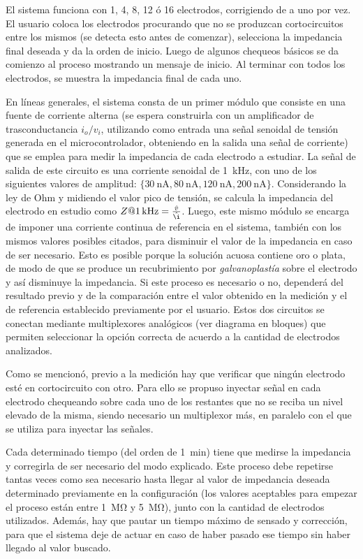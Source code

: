 El sistema funciona con 1, 4, 8, 12 ó 16 electrodos, corrigiendo de a uno por vez. El usuario coloca los electrodos procurando que no se produzcan cortocircuitos entre los mismos (se detecta esto antes de comenzar), selecciona la impedancia final deseada y da la orden de inicio. Luego de algunos chequeos básicos se da comienzo al proceso mostrando un mensaje de inicio. Al terminar con todos los electrodos, se muestra la impedancia final de cada uno. 

En líneas generales, el sistema consta de un primer módulo que consiste en una fuente de corriente alterna (se espera construirla con un amplificador de trasconductancia $i_o/v_i$, utilizando como entrada una señal senoidal de tensión generada en el microcontrolador, obteniendo en la salida una señal de corriente) que se emplea para medir la impedancia de cada electrodo a estudiar. La señal de salida de este circuito es una corriente senoidal de \SI{1}{\kilo\hertz}, con uno de los siguientes valores de amplitud: $\{\SI{30}{\nano\ampere}, \SI{80}{\nano\ampere}, \SI{120}{\nano\ampere}, \SI{200}{\nano\ampere}\}$. Considerando la ley de Ohm y midiendo el valor pico de tensión, se calcula la impedancia del electrodo en estudio como $Z@\SI{1}{\kilo\hertz} = \frac{\hat{v}}{\hat{\i}}$. Luego, este mismo módulo se encarga de imponer una corriente continua de referencia en el sistema, también con los mismos valores posibles citados, para disminuir el valor de la impedancia en caso de ser necesario. Esto es posible porque la solución acuosa contiene oro o plata, de modo de que se produce un recubrimiento por \emph{galvanoplastía} sobre el electrodo y así disminuye la impedancia. Si este proceso es necesario o no, dependerá del resultado previo y de la comparación entre el valor obtenido en la medición y el de referencia establecido previamente por el usuario. Estos dos circuitos se conectan mediante multiplexores analógicos (ver diagrama en bloques) que permiten seleccionar la opción correcta de acuerdo a la cantidad de electrodos analizados. 

Como se mencionó, previo a la medición hay que verificar que ningún electrodo esté en cortocircuito con otro. Para ello se propuso inyectar señal en cada electrodo chequeando sobre cada uno de los restantes que no se reciba un nivel elevado de la misma, siendo necesario un multiplexor más, en paralelo con el que se utiliza para inyectar las señales.

Cada determinado tiempo (del orden de \SI{1}{\minute}) tiene que medirse la impedancia y corregirla de ser necesario del modo explicado. Este proceso debe repetirse tantas veces como sea necesario hasta llegar al valor de impedancia deseada determinado previamente en la configuración (los valores aceptables para empezar el proceso están entre \SI{1}{\mega\ohm} y \SI{5}{\mega\ohm}), junto con la cantidad de electrodos utilizados. Además, hay que pautar un tiempo máximo de sensado y corrección, para que el sistema deje de actuar en caso de haber pasado ese tiempo sin haber llegado al valor buscado.



